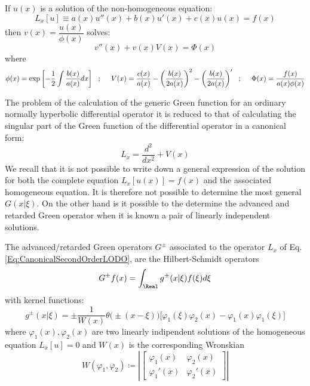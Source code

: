 \documentclass[Main]{subfiles}
\begin{document}
	\begin{proposition}
	If $u(x)$ is a solution of the non-homogeneous equation:
	\begin{displaymath}
		L_x[u] \equiv a(x) u''(x) + b(x) u'(x) + c(x) u(x) = f(x)
	\end{displaymath}
	then $v(x) =  \dfrac{u(x)}{\phi(x)}$ solves:
	\begin{displaymath}
		v''(x) +v(x) V(x) = \Phi(x)
	\end{displaymath}
	where
	\begin{displaymath}
		\tiny{
		\phi(x) =  \exp \left[-\frac{1}{2}\int \frac{b(x)}{a(x)}dx \right] \quad ; \qquad
		V(x) = \dfrac{c(x)}{a(x)} - \left( \frac{b(x)}{2a(x)} \right)^2 - \left( \frac{b(x)}{2a(x)} \right)' \quad ; \qquad
		\Phi(x) = \frac{f(x)}{a(x) \phi(x)}}
	\end{displaymath}
	\end{proposition}
	The problem of the calculation of the generic Green function for an ordinary normally hyperbolic differential operator it is reduced to that of calculating the singular part of the Green function of the differential operator in a canonical form:
	\begin{equation}\label{Eq:CanonicalSecondOrderLODO}
		L_x=  \frac{d^2}{dx^2} + V(x)
	\end{equation}
	We recall that it is not possible to write down a general expression of the solution for both the complete equation $L_x\left[u(x)\right] = f(x)$ and the associated homogeneous equation. It is therefore not possible to determine the most general $G(x\vert \xi)$.
	On the other hand is it possible to the determine the advanced and retarded Green operator when it is known a pair of linearly independent solutions.
	\begin{proposition}
		The advanced/retarded Green operators $G^\pm$ associated to the operator $L_x$ of Eq. \ref{Eq:CanonicalSecondOrderLODO},
		are the Hilbert-Schmidt operators
		\begin{displaymath}
			G^\pm f(x) = \int_\Real g^\pm (x \vert \xi) f(\xi) d \xi
		\end{displaymath}
		with kernel functions:
		\begin{equation}\label{Eq:AdvRetGreenFunction}
			g^\pm ( x \vert \xi ) = 
			\pm \frac{1}{W(x)} \theta\big( \pm ( x-\xi) \big) \big[ \varphi_1(\xi)\varphi_2(x) - \varphi_1(x)\varphi_1(\xi) \big]
		\end{equation}
		where $\varphi_1(x) , \varphi_2(x)$ are two linearly indipendent solutions of  the homogeneous equation $L_x[u]=0$ and $W(x)$ is the corresponding Wronskian
		\begin{displaymath}
			W(\varphi_1 , \varphi_2) \coloneqq \left\vert 
				\begin{bmatrix}
        			\varphi_1(x)	&	\varphi_2(x) \\
        			\varphi_1'(x)	&	\varphi_2'(x)
     			\end{bmatrix} 
     		\right\vert
		\end{displaymath}
	\end{proposition}
\end{document}
